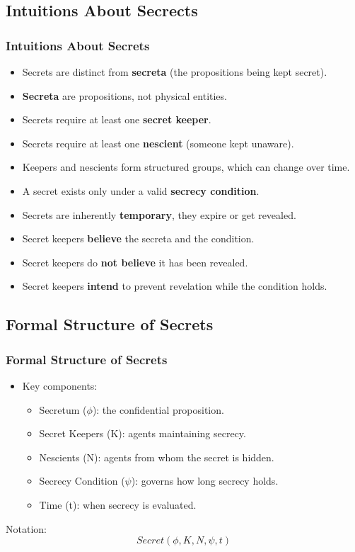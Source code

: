 \documentclass[aspectratio=169]{beamer}
\begin{document}
\subsection{Intuitions About Secrects}
\begin{frame}
\frametitle{Intuitions About Secrets}
\begin{itemize}
    \item Secrets are distinct from \textbf{secreta} (the propositions being kept secret).
    \item \textbf{Secreta} are propositions, not physical entities.
    \item Secrets require at least one \textbf{secret keeper}.
    \item Secrets require at least one \textbf{nescient} (someone kept unaware).
    \item Keepers and nescients form structured groups, which can change over time.
    \item A secret exists only under a valid \textbf{secrecy condition}.
    \item Secrets are inherently \textbf{temporary}, they expire or get revealed.
    \item Secret keepers \textbf{believe} the secreta and the condition.
    \item Secret keepers do \textbf{not believe} it has been revealed.
    \item Secret keepers \textbf{intend} to prevent revelation while the condition holds.
\end{itemize}
\end{frame}

\subsection{Formal Structure of Secrets}
\begin{frame}
\frametitle{Formal Structure of Secrets}
{\Large
\begin{itemize}
    \item Key components:
    \begin{itemize}
        \Large 
        \item Secretum ($\phi$): the confidential proposition.
        \item Secret Keepers (K): agents maintaining secrecy.
        \item Nescients (N): agents from whom the secret is hidden.
        \item Secrecy Condition ($\psi$): governs how long secrecy holds.
        \item Time (t): when secrecy is evaluated.
    \end{itemize}
\end{itemize}
}
{\normalsize
\begin{block}{Notation:}
\[
Secret(\phi, K, N, \psi, t)
\]
\end{block}
}
\end{frame}
\end{document}
